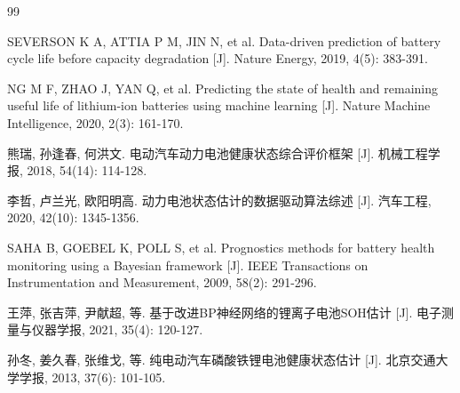 \documentclass[twocolumn,10pt,a4paper,twoside]{ctexart}
\begin{document}
\vspace{1em}
\renewcommand{\refname}{\normalsize\textbf{参考文献}}
\begin{thebibliography}{99}

     SEVERSON K A, ATTIA P M, JIN N, et al. Data-driven prediction of battery cycle life before capacity degradation [J]. Nature Energy, 2019, 4(5): 383-391.

     NG M F, ZHAO J, YAN Q, et al. Predicting the state of health and remaining useful life of lithium-ion batteries using machine learning [J]. Nature Machine Intelligence, 2020, 2(3): 161-170.

     熊瑞, 孙逢春, 何洪文. 电动汽车动力电池健康状态综合评价框架 [J]. 机械工程学报, 2018, 54(14): 114-128.

     李哲, 卢兰光, 欧阳明高. 动力电池状态估计的数据驱动算法综述 [J]. 汽车工程, 2020, 42(10): 1345-1356.


     SAHA B, GOEBEL K, POLL S, et al. Prognostics methods for battery health monitoring using a Bayesian framework [J]. IEEE Transactions on Instrumentation and Measurement, 2009, 58(2): 291-296.

     王萍, 张吉萍, 尹献超, 等. 基于改进BP神经网络的锂离子电池SOH估计 [J]. 电子测量与仪器学报, 2021, 35(4): 120-127.

     孙冬, 姜久春, 张维戈, 等. 纯电动汽车磷酸铁锂电池健康状态估计 [J]. 北京交通大学学报, 2013, 37(6): 101-105.

\end{thebibliography}
\end{document}

